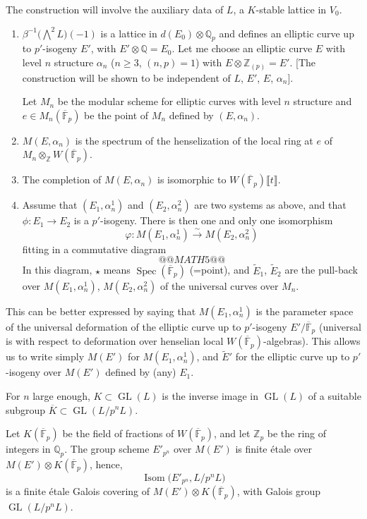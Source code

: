 \documentclass[11pt,a4paper]{article}
\theoremstyle{plain}
\theoremstyle{definition}
\theoremstyle{remark}
\DeclareMathOperator{\Spec}{Spec}
\DeclareMathOperator{\Isom}{Isom}
\DeclareMathOperator{\GL}{GL}
\newcommand{\Q}{\mathbb{Q}}
\newcommand{\Z}{\mathbb{Z}}
\newcommand{\Fpbar}{\overline{\mathbb{F}}_{p}}
\newcommand{\Zp}{\mathbb{Z}_{p}}
\newcommand{\Qp}{\mathbb{Q}_{p}}
\begin{document}
The construction will involve the auxiliary data of $L$, a $K$-stable lattice in $V_{0}$.
\begin{enumerate}[label=(\alph*)]
\item $\beta^{-1}\bigl(\bigwedge^{2} L\bigr)(-1)$ is a lattice in $d(E_{0}) \otimes \Qp$ and defines an elliptic curve up to $p'$-isogeny $E'$, with $E' \otimes \Q = E_{0}$. Let me choose an elliptic curve $E$ with level $n$ structure $\alpha_{n}$ ($n \geq 3$, $(n, p) = 1$) with $E \otimes \Z_{(p)} = E'$. [The construction will be shown to be independent of $L$, $E'$, $E$, $\alpha_{n}$].

Let $M_{n}$ be the modular scheme for elliptic curves with level $n$ structure and $e \in M_{n}(\Fpbar)$ be the point of $M_{n}$ defined by $(E, \alpha_{n})$.

\item $M(E, \alpha_{n})$ is the spectrum of the henselization of the local ring at $e$ of $M_{n} \otimes_{\Z} W(\Fpbar)$.

\item The completion of $M(E, \alpha_{n})$ is isomorphic to $W(\Fpbar)\llbracket t \rrbracket$.

\item Assume that $(E_{1}, \alpha_{n}^{1})$ and $(E_{2}, \alpha_{n}^{2})$ are two systems as above, and that $\phi : E_{1} \to E_{2}$ is a $p'$-isogeny. There is then one and only one isomorphism
\[
\varphi : M(E_{1}, \alpha_{n}^{1}) \xrightarrow{\sim} M(E_{2}, \alpha_{n}^{2})
\]
fitting in a commutative diagram
\[
@@MATH5@@
\]
In this diagram, $\star$ means $\Spec(\Fpbar)$ (=point), and $\widetilde{E}_{1}$, $\widetilde{E}_{2}$ are the pull-back over $M(E_{1}, \alpha_{n}^{1})$, $M(E_{2}, \alpha_{n}^{2})$ of the universal curves over $M_{n}$.
\end{enumerate}

This can be better expressed by saying that $M(E_{1}, \alpha_{n}^{1})$ is the parameter space of the universal deformation of the elliptic curve up to $p'$-isogeny $E'/\Fpbar$ (universal is with respect to deformation over henselian local $W(\Fpbar)$-algebras). This allows us to write simply $M(E')$ for $M(E_{1}, \alpha_{n}^{1})$, and $\widetilde{E}'$ for the elliptic curve up to $p'$-isogeny over $M(E')$ defined by (any) $E_{1}$.

For $n$ large enough, $K \subset \GL(L)$ is the inverse image in $\GL(L)$ of a suitable subgroup $\overline{K} \subset \GL(L/p^{n}L)$.

Let $K(\Fpbar)$ be the field of fractions of $W(\Fpbar)$, and let $\Zp$ be the ring of integers in $\Qp$. The group scheme $E'_{p^{n}}$ over $M(E')$ is finite étale over $M(E') \otimes K(\Fpbar)$, hence,
\[
\Isom\bigl(E'_{p^{n}}, L/p^{n}L\bigr)
\]
is a finite étale Galois covering of $M(E') \otimes K(\Fpbar)$, with Galois group $\GL(L/p^{n}L)$.
\end{document}
